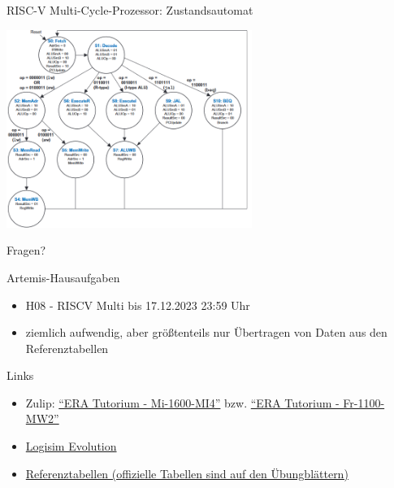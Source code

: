 \documentclass[
  german,            %
  aspectratio=169,    %
]{tumbeamer}
\begin{document}
\begin{frame}[c]{RISC-V Multi-Cycle-Prozessor: Zustandsautomat}{}
  \begin{center}
    \includegraphics[width=0.6\textwidth]{w08_multi_cycle_states.png}
  \end{center}
  \centering
\end{frame}

\begin{frame}[c]{}{}
  \begin{center}
    \LARGE Fragen?
  \end{center}
\end{frame}

\begin{frame}[c, fragile]{Artemis-Hausaufgaben}{}
  \begin{itemize}
    \item H08 - RISCV Multi bis 17.12.2023 23:59 Uhr
    \item ziemlich aufwendig, aber größtenteils nur Übertragen von Daten aus den Referenztabellen
  \end{itemize}
\end{frame}

\begin{frame}[fragile, c]{Links}{}
  \begin{itemize}
    \item Zulip: \href{https://zulip.in.tum.de/#narrow/stream/1917-ERA-Tutorium---Mi-1600-MI4}{\enquote{ERA Tutorium - Mi-1600-MI4}}
    bzw. \href{https://zulip.in.tum.de/#narrow/stream/1940-ERA-Tutorium---Fr-1100-MW2}{\enquote{ERA Tutorium - Fr-1100-MW2}}
    \item \href{https://github.com/logisim-evolution/logisim-evolution/releases}{Logisim Evolution}
    \item \href{https://courses.edx.org/assets/courseware/v1/f06a2dc0c856f60ec0711e9f5e1c98cf/asset-v1:HarveyMuddX+ENGR85B+1T2023+type@asset+block/FinalReferences.pdf}{Referenztabellen (offizielle Tabellen sind auf den Übungblättern)}
  \end{itemize}
\end{frame}

\maketitle
\end{document}
